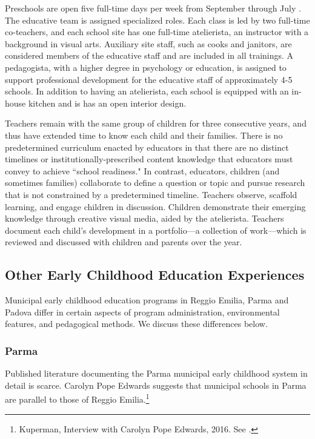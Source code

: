 Preschools are open five full-time days per week from September through July \citep{Giudici-Nicolosi_2014_Reggio-Approach}. The educative team is assigned specialized roles. Each class is led by two full-time co-teachers, and each school site has one full-time atelierista, an instructor with a background in visual arts. Auxiliary site staff, such as cooks and janitors, are considered members of the educative staff and are included in all trainings. A pedagogista, with a higher degree in psychology or education, is assigned to support professional development for the educative staff of approximately 4-5 schools. In addition to having an atelierista, each school is equipped with an in-house kitchen and is has an open interior design.  

Teachers remain with the same group of children for three consecutive years, and thus have extended time to know each child and their families. There is no predetermined curriculum enacted by educators in that there are no distinct timelines or institutionally-prescribed content knowledge that educators must convey to achieve ``school readiness." In contrast, educators, children (and sometimes families) collaborate to define a question or topic and pursue research that is not constrained by a predetermined timeline. Teachers observe, scaffold learning, and engage children in discussion. Children demonstrate their emerging knowledge through creative visual media, aided by the atelierista. Teachers document each child's development in a portfolio---a collection of work---which is reviewed and discussed with children and parents over the year. 

\subsection{Other Early Childhood Education Experiences}

Municipal early childhood education programs in Reggio Emilia, Parma and Padova differ in certain aspects of program administration, environmental features, and pedagogical methods. We discuss these differences below. 

\subsubsection{Parma}

Published literature documenting the Parma municipal early childhood system in detail is scarce. Carolyn Pope Edwards suggests that municipal schools in Parma are parallel to those of Reggio Emilia.\footnote{Kuperman, Interview with Carolyn Pope Edwards, 2016. See \citet{Edwards-etal-eds_1998_Hundred-Languages}.} 

